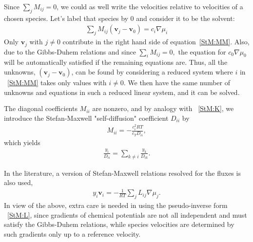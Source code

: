 \documentclass[../main.tex]{subfiles}
\begin{document}
Since $\sum_{j } M_{ij} = 0$, we could as well write the velocities relative to velocities of a chosen species. Let's label that species by 0 and consider it to be the solvent:
\begin{equation} \begin{array}{l}
    \displaystyle \sum_{j }  M_{ij} \left(  \mathbf{v}_j - \mathbf{v}_0 \right) = c_i \nabla \mu_i
     \label{StM:MM}
\end{array} \end{equation}
Only $\mathbf{v}_j$ with $j\neq 0$ contribute in the right hand side of equation~\ref{StM:MM}. Also, due to the Gibbs-Duhem relations and since $\sum_{i} M_{ij}=0,$ the equation for $c_0 \nabla \mu_0$ will be automatically satisfied if the remaining equations are. Thus, all the unknowns, $\left(  \mathbf{v}_j - \mathbf{v}_0 \right)$, can be found by considering a reduced system where $i$ in ~\ref{StM:MM} takes only values with $i\neq 0$. We then have the same number of unknowns and equations in such a reduced linear system, and it can be solved.

The diagonal coefficients $M_{ii}$ are nonzero, and by analogy with ~\ref{StM:K}, we introduce the Stefan-Maxwell "self-diffusion" coefficient $D_{ii}$ by
\begin{equation} \begin{array}{l}
    \displaystyle M_{ii} = -\frac{c_i^2 R  T }{c_T D_{ii}},
\end{array} \end{equation}
which yields
\begin{equation} \begin{array}{l}
    \displaystyle  \frac{y_i }{ D_{ii}} = \sum_{k\neq i} \frac{y_k }{ D_{ik}}.
     \label{StM:sd}
\end{array} \end{equation}

In the literature, a version of Stefan-Maxwell relations resolved for the fluxes is also used,
\begin{equation} \begin{array}{l}
    \displaystyle y_i \mathbf{v}_i  = - \frac{1}{RT} \sum_{j} L_{ij} \nabla \mu_j .
    \label{StM:L}
\end{array} \end{equation}
\noindent In view of the above, extra care is needed in using the pseudo-inverse form ~\ref{StM:L}, since gradients of chemical potentials are not all independent and must satisfy the Gibbs-Duhem relations, while species velocities are determined by such gradients only up to a reference velocity.
\end{document}
